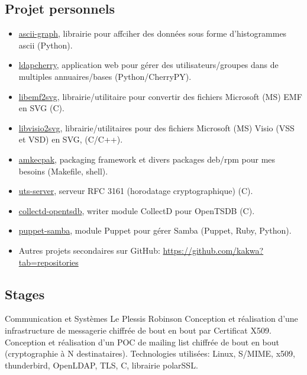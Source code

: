 \documentclass[10pt,a4paper,sans]{moderncv}        %
\begin{document}
\subsection{Projet personnels}
              {}
              {}
              {}
              {
                \begin{itemize}
                \item \href{https://github.com/kakwa/py-ascii-graph}{ascii-graph}, librairie pour affciher des données sous forme d'histogrammes ascii (Python).
                \item \href{https://github.com/kakwa/ldapcherry}{ldapcherry}, application web pour gérer des utilisateurs/groupes dans de multiples annuaires/bases (Python/CherryPY).
                \item \href{https://github.com/kakwa/libemf2svg}{libemf2svg}, librairie/utilitaire pour convertir des fichiers Microsoft (MS) EMF en SVG (C).
                \item \href{https://github.com/kakwa/libvisio2svg}{libvisio2svg}, librairie/utilitaires pour des fichiers Microsoft (MS) Visio (VSS et VSD) en SVG, (C/C++).
                \item \href{https://github.com/kakwa/amkecpak}{amkecpak}, packaging framework et divers packages deb/rpm pour mes besoins (Makefile, shell).
                \item \href{https://github.com/kakwa/uts-server}{uts-server}, serveur RFC 3161 (horodatage cryptographique) (C).
                \item \href{https://github.com/kakwa/collectd-opentsdb}{collectd-opentsdb}, writer module CollectD pour OpenTSDB (C).
                \item \href{https://github.com/kakwa/puppet-samba}{puppet-samba}, module Puppet pour gérer Samba (Puppet, Ruby, Python).
                \item Autres projets secondaires sur GitHub: \url{https://github.com/kakwa?tab=repositories}
                \end{itemize}
}

\subsection{Stages}

              {Communication et Systèmes}
              {Le Plessis Robinson}
              {}
              {Conception et réalisation d'une infrastructure de messagerie chiffrée de bout en bout par
               Certificat X509. Conception et réalisation d'un POC de mailing list chiffrée de bout en bout
               (cryptographie à N destinataires).
               \newline Technologies utilisées: Linux, S/MIME, x509, thunderbird, OpenLDAP, TLS, C, librairie polarSSL.
              }
\end{document}
